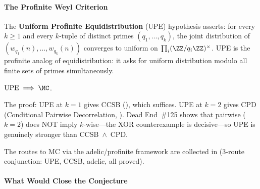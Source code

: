 \paragraph{The Profinite Weyl Criterion}

The \textbf{Uniform Profinite Equidistribution} (UPE) hypothesis
asserts: for every $k \geq 1$ and every $k$-tuple of distinct primes
$(q_1, \ldots, q_k)$, the joint distribution of
$(w_{q_1}(n), \ldots, w_{q_k}(n))$ converges to uniform on
$\prod_i (\ZZ/q_i\ZZ)^\times$.  UPE is the profinite analog of
equidistribution: it asks for uniform distribution modulo all finite
sets of primes simultaneously.

\begin{theorem}
$\mathrm{UPE} \;\Longrightarrow\; \MC$.
\end{theorem}

\noindent The proof: UPE at $k = 1$ gives CCSB
(), which suffices.
UPE at $k = 2$ gives CPD (Conditional Pairwise Decorrelation,
).  Dead End~\#125 shows
that pairwise ($k = 2$) does NOT imply $k$-wise---the XOR
counterexample is decisive---so UPE is genuinely stronger than
CCSB~$\wedge$~CPD\@.

The routes to MC via the adelic/profinite framework are collected in
 (3-route conjunction: UPE, CCSB,
adelic, all proved).

\paragraph{What Would Close the Conjecture}

